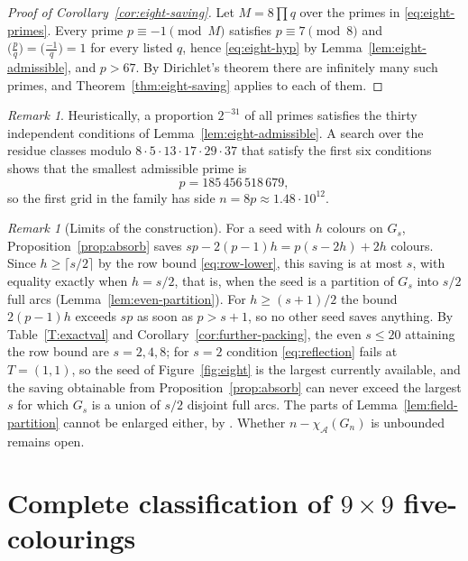 \documentclass[11pt]{article}
\theoremstyle{definition}
\theoremstyle{remark}
\newtheorem{remark}[theorem]{Remark}
\renewcommand{\ge}{\geqslant}
\renewcommand{\le}{\leqslant}
\begin{document}
\begin{proof}[Proof of Corollary~\ref{cor:eight-saving}]
Let \(M=8\prod q\) over the primes in \eqref{eq:eight-primes}.  Every
prime \(p\equiv-1\pmod M\) satisfies \(p\equiv7\pmod8\) and
\(\bigl(\tfrac{p}{q}\bigr)=\bigl(\tfrac{-1}{q}\bigr)=1\) for every
listed \(q\), hence \eqref{eq:eight-hyp} by
Lemma~\ref{lem:eight-admissible}, and \(p>67\).  By Dirichlet's theorem
there are infinitely many such primes, and
Theorem~\ref{thm:eight-saving} applies to each of them.
\end{proof}

\begin{remark}
Heuristically, a proportion \(2^{-31}\) of all primes satisfies the
thirty independent conditions of Lemma~\ref{lem:eight-admissible}.  A
search over the residue classes modulo \(8\cdot5\cdot13\cdot17\cdot29\cdot37\)
that satisfy the first six conditions shows that the smallest admissible
prime is
\[
  p=185\,456\,518\,679,
\]
so the first grid in the family has side \(n=8p\approx1.48\cdot10^{12}\).
\end{remark}

\begin{remark}[Limits of the construction]\label{rem:eight-limits}
For a seed with \(h\) colours on \(G_s\), Proposition~\ref{prop:absorb}
saves \(sp-2(p-1)h=p(s-2h)+2h\) colours.  Since \(h\ge\lceil s/2\rceil\)
by the row bound \eqref{eq:row-lower}, this saving is at most \(s\),
with equality exactly when \(h=s/2\), that is, when the seed is a
partition of \(G_s\) into \(s/2\) full arcs
(Lemma~\ref{lem:even-partition}). For \(h\ge(s+1)/2\) the bound
\(2(p-1)h\) exceeds \(sp\) as soon as \(p>s+1\), so no other seed saves
anything.  By Table~\ref{T:exactval} and
Corollary~\ref{cor:further-packing}, the even \(s\le20\) attaining the
row bound are \(s=2,4,8\); for \(s=2\) condition \eqref{eq:reflection}
fails at \(T=(1,1)\), so the seed of Figure~\ref{fig:eight} is the
largest currently available, and the saving obtainable from
Proposition~\ref{prop:absorb} can never exceed the largest \(s\) for
which \(G_s\) is a union of \(s/2\) disjoint full arcs.  The parts of
Lemma~\ref{lem:field-partition} cannot be enlarged either, by
\cite[Corollary~4]{Kurz2009}.  Whether \(n-\chi_{\mathcal{A}}(G_n)\) is
unbounded remains open.
\end{remark}

\section{Complete classification of \texorpdfstring{\(9\times9\)}{9 x 9}
  five-colourings}
\label{sec:nine-classification}
\end{document}
